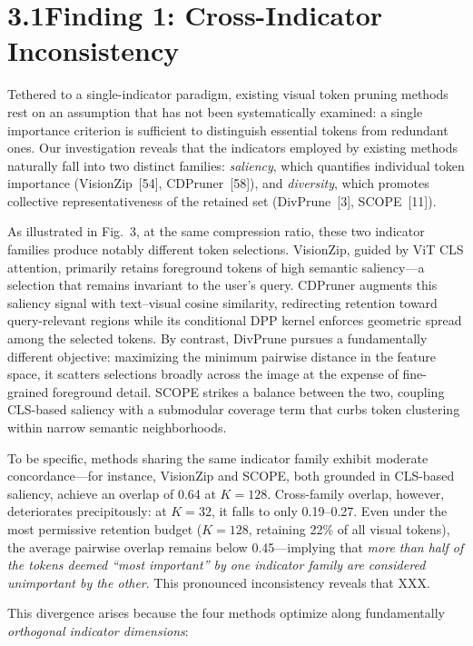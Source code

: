 \documentclass[10pt,letterpaper]{article}
\begin{document}
\section*{3.1\quad Finding 1: Cross-Indicator Inconsistency}

Tethered to a single-indicator paradigm, existing visual token pruning methods
rest on an assumption that has not been systematically examined: a single importance criterion is sufficient to distinguish essential
tokens from redundant ones.
Our investigation reveals that the indicators employed by existing methods
naturally fall into two distinct families: \textit{saliency}, which
quantifies individual token importance (VisionZip~[54], CDPruner~[58]), and
\textit{diversity}, which promotes collective representativeness of the
retained set (DivPrune~[3], SCOPE~[11]).

As illustrated in Fig.~3, at the same compression ratio, these two indicator
families produce notably different token selections.
VisionZip, guided by ViT CLS attention, primarily retains foreground
tokens of high semantic saliency---a selection that remains invariant to the
user's query.
CDPruner augments this saliency signal with text--visual cosine similarity,
redirecting retention toward query-relevant regions while its conditional DPP
kernel enforces geometric spread among the selected tokens.
By contrast, DivPrune pursues a fundamentally different objective: maximizing
the minimum pairwise distance in the feature space, it scatters selections
broadly across the image at the expense of fine-grained foreground detail.
SCOPE strikes a balance between the two, coupling CLS-based saliency with a
submodular coverage term that curbs token clustering within narrow semantic
neighborhoods.

To be specific, methods sharing the same indicator family exhibit moderate
concordance---for instance,
VisionZip and SCOPE, both grounded in CLS-based saliency, achieve an overlap
of 0.64 at $K{=}128$. Cross-family overlap, however, deteriorates
precipitously: at $K{=}32$, it falls to only 0.19--0.27. Even under the
most permissive retention budget ($K{=}128$, retaining 22\% of all visual
tokens), the average pairwise overlap remains below 0.45---implying that
\emph{more than half of the tokens deemed ``most important'' by one indicator
family are considered unimportant by the other}. This pronounced inconsistency
reveals that XXX.

This divergence arises because the four methods optimize along fundamentally
\textit{orthogonal indicator dimensions}:
\end{document}

